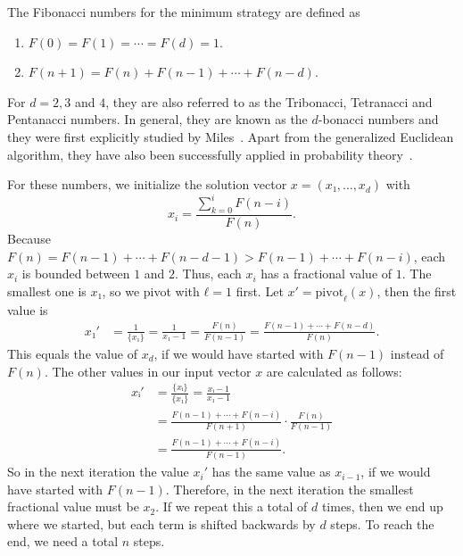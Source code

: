 \begin{definition}
  The Fibonacci numbers for the minimum strategy are defined as
  \begin{enumerate}
    \item $F(0) = F(1) = ⋯ = F(d) = 1$.
    \item $F(n + 1) = F(n) + F(n - 1) + ⋯ + F(n - d)$.
  \end{enumerate}
\end{definition}

For $d = 2, 3$ and $4$, they are also referred to as the Tribonacci, Tetranacci
and Pentanacci numbers.
In general, they are known as the $d$-bonacci numbers
and they were first explicitly studied by Miles~\cite{Miles60}.
Apart from the generalized Euclidean algorithm,
they have also been successfully applied in probability theory~\cite{Philippou82,Raab63,Schlegel94}.

For these numbers, we initialize the solution vector $x = (x₁, …, x_d)$ with
\[
  x_i = \frac{\sum_{k=0}^i F(n - i)}{F(n)}.
\]
Because $F(n) = F(n - 1) + ⋯ + F(n - d - 1) > F(n - 1) + ⋯ + F(n - i)$,
each $x_i$ is bounded between $1$ and $2$.
Thus, each $x_i$ has a fractional value of $1$.
The smallest one is $x₁$, so we pivot with $ℓ = 1$ first.
Let $x' = \mathrm{pivot}_ℓ(x)$, then the first value is
\begin{align*}
  x₁' &
  = \frac{1}{\{x₁\}}
  = \frac{1}{x₁ - 1}
  = \frac{F(n)}{F(n - 1)}
  = \frac{F(n - 1) + ⋯ + F(n - d)}{F(n)}.
\end{align*}
This equals the value of $x_d$, if we would have started with $F(n-1)$ instead of $F(n)$.
The other values in our input vector $x$ are calculated as follows:
\begin{align*}
  xᵢ'
  & = \frac{\{xᵢ\}}{\{x₁\}} = \frac{xᵢ - 1}{x₁ - 1} \\
  & = \frac{F(n - 1) + ⋯ + F(n - i)}{F(n + 1)} · \frac{F(n)}{F(n - 1)} \\
  & = \frac{F(n - 1) + ⋯ + F(n - i)}{F(n - 1)}.
\end{align*}
So in the next iteration the value $x_i'$ has the same value as $x_{i-1}$, if we
would have started with $F(n - 1)$.
Therefore, in the next iteration the smallest fractional value must be $x_2$.
If we repeat this a total of $d$ times, then we end up where we started, but
each term is shifted backwards by $d$ steps.
To reach the end, we need a total $n$ steps.


